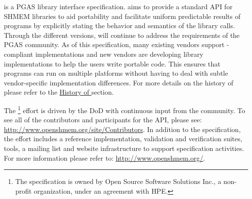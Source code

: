 \openshmem is a \ac{PGAS} library interface specification. \openshmem aims to
provide a standard \ac{API} for SHMEM libraries to aid portability and
facilitate uniform predictable results of \openshmem programs by explicitly
stating the behavior and semantics of the \openshmem library calls. Through the
different versions, \openshmem will continue to address the requirements of the
\ac{PGAS} community.  As of this specification, many existing vendors support
\openshmem-compliant implementations and new vendors are developing
\openshmem library implementations to help the users write portable \openshmem
code. This ensures that programs can run on multiple platforms without having to
deal with subtle vendor-specific implementation differences. For more details on
the history of \openshmem please refer to the
\hyperref[sec:openshmem_history]{History of \openshmem} section.  

The \openshmem\footnote{The \openshmem specification is owned by Open Source
Software Solutions Inc., a non-profit organization, under an agreement with
\ac{HPE}.} effort is driven by the \ac{DoD} with continuous input from the \openshmem community.
To see all of the contributors and participants for the \openshmem API,
please see: \url{http://www.openshmem.org/site/Contributors}. In addition to the
specification, the effort includes a reference \openshmem
implementation, validation and verification suites, tools, a mailing list and
website infrastructure to support specification activities. For more information
please refer to: \url{http://www.openshmem.org/}.
